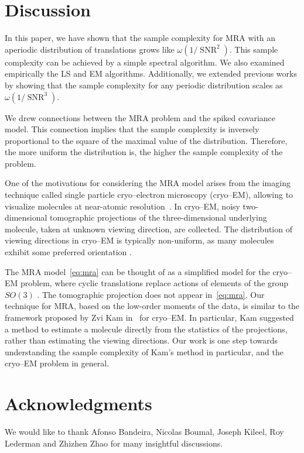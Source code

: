 \documentclass{IEEEtran}
\numberwithin{equation}{section}
\numberwithin{figure}{section}
\theoremstyle{plain}
\theoremstyle{definition}
\theoremstyle{remark}
\theoremstyle{plain}
\theoremstyle{remark}
\theoremstyle{plain}
\theoremstyle{plain}
\theoremstyle{remark}
\newcommand{\SNR}{\operatorname{SNR}}
\begin{document}
\section{Discussion} \label{sec:conlusion}

In this paper, we have shown that the sample complexity for MRA with an aperiodic distribution of translations grows like $\omega(1/\SNR^2)$. This sample complexity can be achieved by a simple spectral algorithm. We also examined empirically the LS and EM algorithms.
Additionally, we extended previous works by showing that the sample complexity for any periodic distribution scales as $\omega(1/\SNR^3)$. 

We drew connections between the MRA problem and the spiked covariance model. This connection implies that the sample complexity is inversely proportional to the square of the maximal value of the distribution. Therefore, the more uniform the distribution is, the higher the sample complexity of the problem. 

One of the motivations for considering the MRA model arises from the imaging technique called single particle cryo--electron microscopy (cryo--EM), allowing to visualize molecules at near-atomic resolution~\cite{bartesaghi20152,sirohi20163}. In cryo--EM, noisy two-dimensional tomographic projections of the three-dimensional underlying molecule, taken at unknown viewing direction, are collected. The distribution of viewing directions in cryo--EM is typically non-uniform, as many molecules exhibit some preferred orientation \cite{frank1987tilt}.

The MRA model~\eqref{eq:mra} can be thought of as a simplified model for the cryo--EM problem, where cyclic translations replace actions of elements of the group $SO(3)$ \cite{singer2018mathematics}. The tomographic projection does not appear in~\eqref{eq:mra}. Our technique for MRA, based on the low-order moments of the data, is similar to the framework proposed by Zvi Kam in~\cite{kam1980reconstruction,levin20183d} for cryo--EM. In particular, Kam suggested a method to estimate a molecule directly from the statistics of the projections, rather than estimating the viewing directions. Our work is one step towards understanding the sample complexity of Kam's method in particular, and the cryo--EM problem in general. 


\section*{Acknowledgments}
We would like to thank Afonso Bandeira, Nicolas Boumal, Joseph Kileel, Roy Lederman and Zhizhen Zhao for many insightful discussions.
\end{document}
